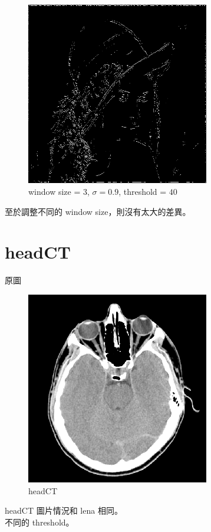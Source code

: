 \documentclass[conference]{IEEEtran}
\begin{document}
\begin{figure}[H]
\centerline{\includegraphics[width=8cm]{lena07.png}}
\caption{window size = $3$, $\sigma=0.9$,  threshold = $40$}
\label{lena07}
\end{figure}

至於調整不同的 window size，則沒有太大的差異。

\section{headCT}

原圖

\begin{figure}[H]
\centerline{\includegraphics[width=8cm]{headCT.png}}
\caption{headCT}
\label{headCT}
\end{figure}

headCT 圖片情況和 lena 相同。\\

不同的 threshold。
\end{document}
